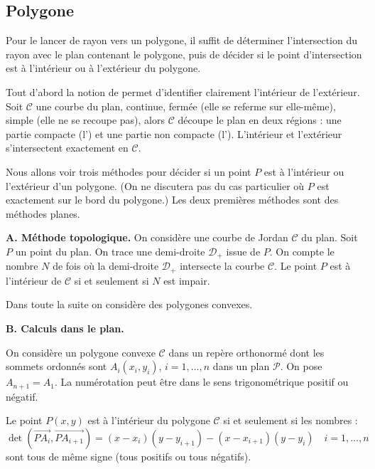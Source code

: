 \documentclass[11pt,class=report,crop=false]{standalone}
\begin{document}
\subsection{Polygone}

Pour le lancer de rayon vers un polygone, il suffit de déterminer l'intersection du rayon avec le plan contenant le polygone, puis de décider si le point d'intersection est à l'intérieur ou à l'extérieur du polygone.




Tout d'abord la notion de  permet d'identifier clairement l'intérieur de l'extérieur. Soit $\mathcal{C}$ une courbe du plan, continue, fermée (elle se referme sur elle-même), simple (elle ne se recoupe pas), alors $\mathcal{C}$ découpe le plan en deux régions : une partie compacte (l') et une partie non compacte (l'). L'intérieur et l'extérieur s'intersectent exactement en $\mathcal{C}$.


Nous allons voir trois méthodes pour décider si un point $P$ est à l'intérieur ou l'extérieur d'un polygone.  (On ne discutera pas du cas particulier où $P$ est exactement sur le bord du polygone.) Les deux premières méthodes sont des méthodes planes.

\medskip
\textbf{A. Méthode topologique.}
On considère une courbe de Jordan $\mathcal{C}$ du plan. Soit $P$ un point du plan.
On trace une demi-droite $\mathcal{D}_+$ issue de $P$. On compte le nombre $N$ de fois où la demi-droite $\mathcal{D}_+$ intersecte la courbe $\mathcal{C}$. Le point $P$ est à l'intérieur de $\mathcal{C}$ si et seulement si $N$ est impair.


Dans toute la suite on considère des polygones convexes.

\medskip
\textbf{B. Calculs dans le plan.}

On considère un polygone convexe $\mathcal{C}$ dans un repère orthonormé dont les sommets ordonnés sont $A_i(x_i,y_i)$, $i=1,\ldots,n$ dans un plan $\mathcal{P}$. 
On pose $A_{n+1}=A_1$.
La numérotation peut être dans le sens trigonométrique positif ou négatif.

\begin{proposition}
\label{prop:trianglepos}
Le point $P(x,y)$ est à l'intérieur du polygone $\mathcal{C}$ si et seulement si
les nombres :
$$\det( \vec{PA_i},\vec{PA_{i+1}} ) = (x-x_i)(y-y_{i+1}) - (x-x_{i+1})(y-y_i) \quad i=1,\ldots,n$$
sont tous de même signe (tous positifs ou tous négatifs).
\end{proposition}
\end{document}
